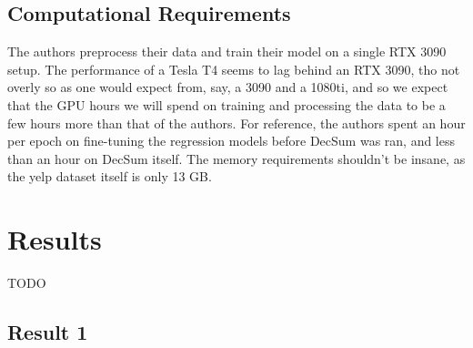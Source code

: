 \documentclass{article}
\begin{document}
\subsection{Computational Requirements}
The authors preprocess their data and train their model on a single RTX 3090 setup. The performance of a Tesla T4 seems to lag behind an RTX 3090, tho not overly so as one would expect from, say, a
3090 and a 1080ti, and so we expect that the GPU hours we will spend on training and processing the data to be a few hours more than that of the authors. For reference, the authors spent an hour per
epoch on fine-tuning the regression models before DecSum was ran, and less than an hour on DecSum itself. The memory requirements shouldn’t be insane, as the yelp dataset itself is only 13 GB.

\section{Results}
TODO

\subsection{Result 1}
\end{document}
